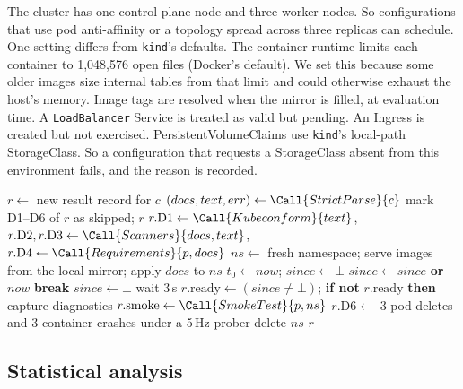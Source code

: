 The cluster has one control-plane node and three worker nodes. So configurations that use pod anti-affinity or a topology spread across three replicas can schedule. One setting differs from \texttt{kind}'s defaults. The container runtime limits each container to 1,048,576 open files (Docker's default). We set this because some older images size internal tables from that limit and could otherwise exhaust the host's memory. Image tags are resolved when the mirror is filled, at evaluation time. A \texttt{LoadBalancer} Service is treated as valid but pending. An Ingress is created but not exercised. PersistentVolumeClaims use \texttt{kind}'s local-path StorageClass. So a configuration that requests a StorageClass absent from this environment fails, and the reason is recorded.

\begin{algorithm}[t]
\caption{Evaluating one configuration $c$ of project $p$.}\label{alg:evaluate}
\small
\begin{algorithmic}[1]
\State $r \gets$ new result record for $c$
\State $(docs, text, err) \gets \Call{StrictParse}{c}$ 
  \State mark D1--D6 of $r$ as skipped; \Return $r$
\EndIf
\State $r.\mathrm{D1} \gets \Call{Kubeconform}{text}$,  
\State $r.\mathrm{D2}, r.\mathrm{D3} \gets \Call{Scanners}{docs, text}$, 
\State $r.\mathrm{D4} \gets \Call{Requirements}{p, docs}$
\State $ns \gets$ fresh namespace; serve images from the local mirror; apply $docs$ to $ns$
\State $t_0 \gets now$; $since \gets \bot$
    \State $since \gets since$ \textbf{or} $now$
      \State \textbf{break}
    \EndIf
  \Else
    \State $since \gets \bot$
  \EndIf
  \State wait 3\,s
\EndWhile
\State $r.\mathrm{ready} \gets (since \neq \bot)$; \textbf{if not} $r.\mathrm{ready}$ \textbf{then} capture diagnostics
\State $r.\mathrm{smoke} \gets \Call{SmokeTest}{p, ns}$ 
  \State $r.\mathrm{D6} \gets$ 3 pod deletes and 3 container crashes under a 5\,Hz prober
\EndIf
\State delete $ns$ 
\State \Return $r$
\end{algorithmic}
\end{algorithm}

\subsection{Statistical analysis}\label{sec:method-analysis}

